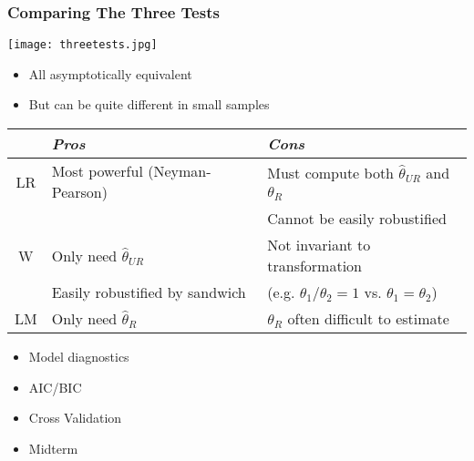 \documentclass{beamer}
\begin{document}
\begin{frame}
\frametitle{Comparing The Three Tests}
\vspace{-.2in}
\begin{center}
\texttt{[image: threetests.jpg]}
\end{center}
\vspace{-.2in}
\begin{itemize}
\item All asymptotically equivalent
\item But can be quite different in small samples
\end{itemize}
\pause
{\small
\begin{tabular}{cll}
\hline\hline
   & {\it Pros}                           & {\it Cons} \\
\hline\hline
LR & Most powerful (Neyman-Pearson) & Must compute both $\hat\theta_{UR}$ and $\hat\theta_{R}$ \\
   &                                & Cannot be easily robustified \pause \\
\hline
W  & Only need $\hat\theta_{UR}$     & Not invariant to transformation \\
   & Easily robustified by sandwich & (e.g. $\theta_1/\theta_2 = 1$ vs. $\theta_1=\theta_2$) \pause \\
\hline
LM & Only need $\hat\theta_{R}$      & $\hat\theta_{R}$ often difficult to estimate \\
\hline\hline
\end{tabular}
}
\end{frame}


\begin{frame}

\huge

\begin{itemize}
\item Model diagnostics
\item AIC/BIC
\item Cross Validation
\item Midterm
\end{itemize}

\end{frame}
\end{document}
